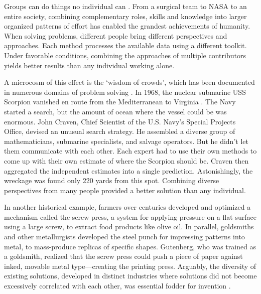 \documentclass[12pt]{article}
\begin{document}

Groups can do things no individual can \citep{woolley2010evidence, coase1937nature, march1958organizations, coleman1988social, north1990institutions, smith1776inquiry, hayek1945use}. From a surgical team to NASA to an entire society, combining complementary roles, skills and knowledge into larger organized patterns of effort has enabled the grandest achievements of humanity. When solving problems, different people bring different perspectives and approaches. Each method processes the available data using a different toolkit. Under favorable conditions, combining the approaches of multiple contributors yields better results than any individual working alone. 

A microcosm of this effect is the `wisdom of crowds', which has been documented in numerous domains of problem solving \citep{surowiecki2005wisdom, condorcet1785essai}. In 1968, the nuclear submarine USS Scorpion vanished en route from the Mediterranean to Virginia \citep{sontag1998blind, craven2002silent, surowiecki2005wisdom}. The Navy started a search, but the amount of ocean where the vessel could be was enormous. John Craven, Chief Scientist of the U.S. Navy's Special Projects Office, devised an unusual search strategy. He assembled a diverse group of mathematicians, submarine specialists, and salvage operators. But he didn't let them communicate with each other. Each expert had to use their own methods to come up with their own estimate of where the Scorpion should be. Craven then aggregated the independent estimates into a single prediction. Astonishingly, the wreckage was found only 220 yards from this spot. Combining diverse perspectives from many people provided a better solution than any individual. 

In another historical example, farmers over centuries developed and optimized a mechanism called the screw press, a system for applying pressure on a flat surface using a large screw, to extract food products like olive oil. In parallel, goldsmiths and other metallurgists developed the steel punch for impressing patterns into metal, to mass-produce replicas of specific shapes. Gutenberg, who was trained as a goldsmith, realized that the screw press could push a piece of paper against inked, movable metal type---creating the printing press. Arguably, the diversity of existing solutions, developed in distinct industries where solutions did not become excessively correlated with each other, was essential fodder for invention \citep{johnson2010where, syed2019rebel}.
\end{document}
